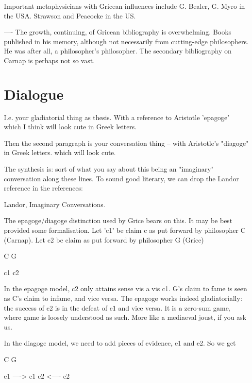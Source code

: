 \documentclass[10pt,titlepage]{book}
\begin{document}
{Important metaphysicians with Gricean influences include G. Bealer, G. Myro 
 in the USA. Strawson and Peacocke in the US.
 
---- The growth, continuing, of Gricean bibliography is overwhelming. Books 
 published in his memory, although not necessarily from cutting-edge  
philosophers. He was after all, a philosopher's philosopher. The secondary  
bibliography on Carnap is perhaps not so vast.

\section{Dialogue}

I.e. your gladiatorial thing as thesis.
With a reference to Aristotle 'epagoge' which I think will look cute in Greek letters.
 
Then the second paragraph is your conversation thing -- with Aristotle's  
"diagoge" in Greek letters. which will look cute.
 
The synthesis is: sort of what you say about this being an "imaginary"  
conversation along these lines. To sound good literary, we can drop the Landor  
reference in the references:
 
   Landor, Imaginary Conversations.
 
 The epagoge/diagoge distinction used by Grice bears on this. It may be best 
 provided some formalisation. Let 'c1' be claim c as put forward by 
philosopher C  (Carnap). Let c2 be claim as put forward by philosopher G (Grice)
 
                  C                         G
 
                  c1                        c2
 
In the epagoge model, c2 only attains sense vis a vis c1. G's claim to fame 
 is seen as C's claim to infame, and vice versa. The epagoge works indeed  
gladiatorially: the success of c2 is in the defeat of c1 and vice versa. It 
is a  zero-sum game, where game is loosely understood as such. More like a 
mediaeval  joust, if you ask us.
 
In the diagoge model, we need to add pieces of evidence, e1 and e2. So we  
get
 
                   C                          G
 
  e1  ---->    c1                          c2  <---- e2
 
}
\end{document}
